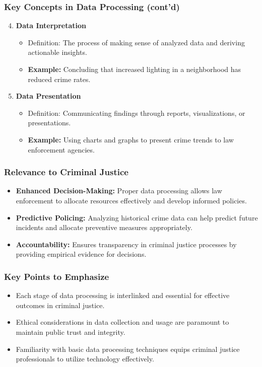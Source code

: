 \documentclass[aspectratio=169]{beamer}
\begin{document}
\begin{frame}[fragile]
    \frametitle{Key Concepts in Data Processing (cont'd)}
    \begin{enumerate}
        \setcounter{enumi}{3}
        \item \textbf{Data Interpretation} 
            \begin{itemize}
                \item Definition: The process of making sense of analyzed data and deriving actionable insights.
                \item \textbf{Example:} Concluding that increased lighting in a neighborhood has reduced crime rates.
            \end{itemize}
        
        \item \textbf{Data Presentation} 
            \begin{itemize}
                \item Definition: Communicating findings through reports, visualizations, or presentations.
                \item \textbf{Example:} Using charts and graphs to present crime trends to law enforcement agencies.
            \end{itemize}
    \end{enumerate}
\end{frame}

\begin{frame}[fragile]
    \frametitle{Relevance to Criminal Justice}
    \begin{itemize}
        \item \textbf{Enhanced Decision-Making:} 
            Proper data processing allows law enforcement to allocate resources effectively and develop informed policies.
        
        \item \textbf{Predictive Policing:} 
            Analyzing historical crime data can help predict future incidents and allocate preventive measures appropriately.
        
        \item \textbf{Accountability:} 
            Ensures transparency in criminal justice processes by providing empirical evidence for decisions.
    \end{itemize}
\end{frame}

\begin{frame}[fragile]
    \frametitle{Key Points to Emphasize}
    \begin{itemize}
        \item Each stage of data processing is interlinked and essential for effective outcomes in criminal justice.
        \item Ethical considerations in data collection and usage are paramount to maintain public trust and integrity.
        \item Familiarity with basic data processing techniques equips criminal justice professionals to utilize technology effectively.
    \end{itemize}
\end{frame}
\end{document}
